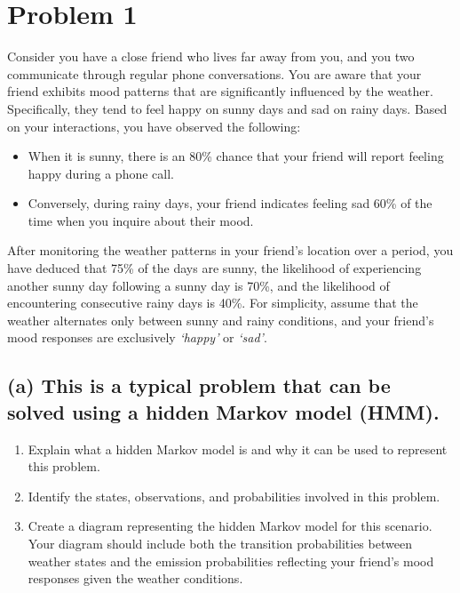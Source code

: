 \section*{Problem 1}

Consider you have a close friend who lives far away from you, and you two communicate through regular
phone conversations. You are aware that your friend exhibits mood patterns that are significantly influenced
by the weather. Specifically, they tend to feel happy on sunny days and sad on rainy days. Based on your
interactions, you have observed the following:

\begin{itemize}
  \item When it is sunny, there is an 80\% chance that your friend will report feeling happy during a phone call.
  \item Conversely, during rainy days, your friend indicates feeling sad 60\% of the time when you inquire about
        their mood.
\end{itemize}

After monitoring the weather patterns in your friend’s location over a period, you have deduced that 75\%
of the days are sunny, the likelihood of experiencing another sunny day following a sunny day is 70\%, and
the likelihood of encountering consecutive rainy days is 40\%. For simplicity, assume that the weather
alternates only between sunny and rainy conditions, and your friend’s mood responses are exclusively
\emph{‘happy’} or \emph{‘sad’}.

\subsection*{(a) This is a typical problem that can be solved using a hidden Markov model (HMM).}

\begin{enumerate}[label=(\roman*)]
\item Explain what a hidden Markov model is and why it can be used to represent this problem.

\item Identify the states, observations, and probabilities involved in this problem.

\item Create a diagram representing the hidden Markov model for this scenario. Your diagram should
      include both the transition probabilities between weather states and the emission probabilities
      reflecting your friend’s mood responses given the weather conditions.
\end{enumerate}

